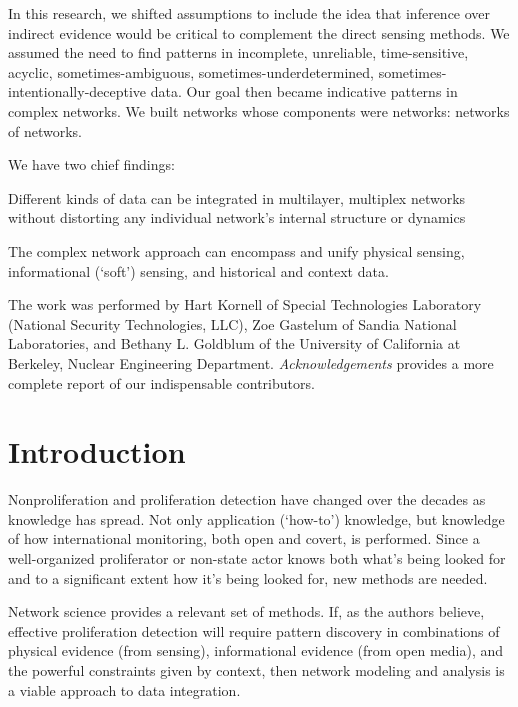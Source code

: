 \documentclass{article} %
\begin{document}
In this research, we shifted assumptions to include the idea that inference over indirect evidence would be critical to complement the  direct sensing methods. We assumed the need to find patterns in incomplete, unreliable, time-sensitive, acyclic, sometimes-ambiguous,  sometimes-underdetermined, sometimes-intentionally-deceptive data. Our goal then became indicative patterns in complex networks. We built networks whose components were networks: networks of networks.

We have two chief findings:
\renewcommand\labelitemi{\tiny$\bullet$}
\begin{itemize*}
\item Different kinds of data can be integrated in multilayer, multiplex networks without distorting any individual network's internal structure or dynamics
\item The complex network approach can encompass and unify physical sensing, informational (`soft') sensing, and historical and context data.
\end{itemize*}

The work was performed by Hart Kornell of Special Technologies Laboratory (National Security Technologies, LLC), Zoe Gastelum of Sandia National Laboratories, and  Bethany L. Goldblum of the University of California at Berkeley, Nuclear Engineering Department. \textit{Acknowledgements} provides a more complete report of our indispensable contributors.

\newpage
\thispagestyle{empty}
\mbox{}
\newpage

\section{Introduction}
Nonproliferation and proliferation detection have changed over the decades as knowledge has spread. Not only application (`how-to') knowledge, but knowledge of how international monitoring, both open and covert, is performed. Since a well-organized proliferator or non-state actor knows both what's being looked for and to a significant extent how it's being looked for, new methods are needed.

Network science provides a relevant set of methods. If, as the authors believe, effective proliferation detection will require pattern discovery in combinations of physical evidence (from sensing), informational evidence (from open media), and the powerful constraints given by context, then network modeling and analysis is a viable approach to data integration.
\end{document}
